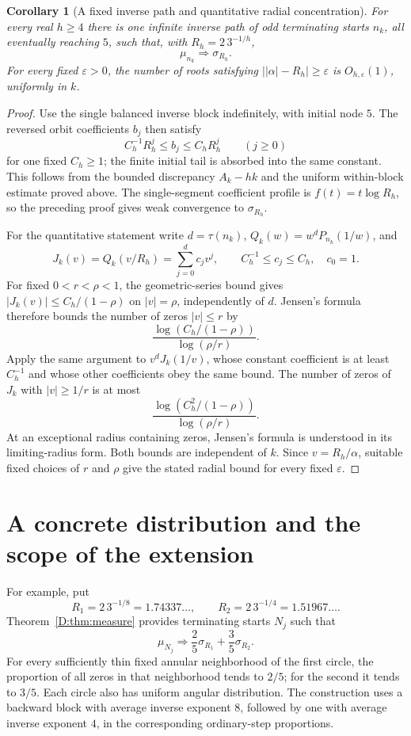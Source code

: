 \documentclass[11pt,a4paper]{article}
\newtheorem{corollary}[theorem]{Corollary}
\theoremstyle{definition}
\theoremstyle{remark}
\numberwithin{equation}{section}
\begin{document}
\begin{corollary}[A fixed inverse path and quantitative radial concentration]
For every real $h\ge4$ there is one infinite inverse path of odd
terminating starts $n_k$, all eventually reaching $5$, such that,
with $R_h=2\,3^{-1/h}$,
\[
 \mu_{n_k}\Longrightarrow\sigma_{R_h}.
\]
For every fixed $\varepsilon>0$, the number of roots satisfying
$\bigl||\alpha|-R_h\bigr|\ge\varepsilon$ is
$O_{h,\varepsilon}(1)$, uniformly in $k$.
\end{corollary}
\begin{proof}
Use the single balanced inverse block indefinitely, with initial
node $5$. The reversed orbit coefficients $b_j$ then satisfy
\[
 C_h^{-1}R_h^j\le b_j\le C_hR_h^j\qquad(j\ge0)
\]
for one fixed $C_h\ge1$; the finite initial tail is absorbed into
the same constant. This follows from the bounded discrepancy
$A_k-hk$ and the uniform within-block estimate proved above.
The single-segment coefficient profile is $f(t)=t\log R_h$, so
the preceding proof gives weak convergence to $\sigma_{R_h}$.

For the quantitative statement write $d=\tau(n_k)$,
$Q_k(w)=w^dP_{n_k}(1/w)$, and
\[
 J_k(v)=Q_k(v/R_h)=\sum_{j=0}^d c_jv^j,
 \qquad C_h^{-1}\le c_j\le C_h,\quad c_0=1.
\]
For fixed $0<r<\rho<1$, the geometric-series bound gives
$|J_k(v)|\le C_h/(1-\rho)$ on $|v|=\rho$, independently of $d$.
Jensen's formula therefore bounds the number of zeros $|v|\le r$ by
\[
 \frac{\log(C_h/(1-\rho))}{\log(\rho/r)}.
\]
Apply the same argument to $v^dJ_k(1/v)$, whose constant
coefficient is at least $C_h^{-1}$ and whose other coefficients
obey the same bound. The number of zeros of $J_k$ with $|v|\ge1/r$
is at most
\[
 \frac{\log(C_h^2/(1-\rho))}{\log(\rho/r)}.
\]
At an exceptional radius containing zeros, Jensen's formula is
understood in its limiting-radius form. Both bounds are independent
of $k$. Since $v=R_h/\alpha$, suitable fixed choices of $r$ and
$\rho$ give the stated radial bound for every fixed $\varepsilon$.
\end{proof}


\section{A concrete distribution and the scope of the extension}
For example, put
\[
 R_1=2\,3^{-1/8}=1.74337\ldots,
 \qquad R_2=2\,3^{-1/4}=1.51967\ldots.
\]
Theorem~\ref{D:thm:measure} provides terminating starts $N_j$ such that
\[
 \mu_{N_j}\Longrightarrow
       \frac25\sigma_{R_1}+\frac35\sigma_{R_2}.
\]
For every sufficiently thin fixed annular neighborhood of the first
circle, the proportion of all zeros in that neighborhood tends to $2/5$;
for the second it tends to $3/5$. Each circle also has uniform angular
distribution. The construction uses a backward block with average inverse
exponent $8$, followed by one with average inverse exponent $4$, in the
corresponding ordinary-step proportions.
\end{document}

